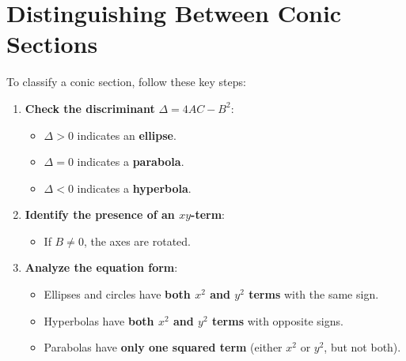 \documentclass{article}
\begin{document}
\section*{Distinguishing Between Conic Sections}

\begin{tipbox}
To classify a conic section, follow these key steps:
\begin{enumerate}
    \item \textbf{Check the discriminant} \( \Delta = 4AC - B^2 \):
    \begin{itemize}
        \item \( \Delta > 0 \) indicates an \textbf{ellipse}.
        \item \( \Delta = 0 \) indicates a \textbf{parabola}.
        \item \( \Delta < 0 \) indicates a \textbf{hyperbola}.
    \end{itemize}
    \item \textbf{Identify the presence of an \( xy \)-term}:
    \begin{itemize}
        \item If \( B \neq 0 \), the axes are rotated.
    \end{itemize}
    \item \textbf{Analyze the equation form}:
    \begin{itemize}
        \item Ellipses and circles have \textbf{both \( x^2 \) and \( y^2 \) terms} with the same sign.
        \item Hyperbolas have \textbf{both \( x^2 \) and \( y^2 \) terms} with opposite signs.
        \item Parabolas have \textbf{only one squared term} (either \( x^2 \) or \( y^2 \), but not both).
    \end{itemize}
\end{enumerate}
\end{tipbox}

\cleardoublepage
{}

\normalsize

\setcounter{page}{1}
\end{document}
